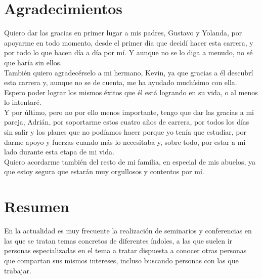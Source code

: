 \documentclass[a4paper, 12pt]{book}
\begin{document}

\chapter*{Agradecimientos}
Quiero dar las gracias en primer lugar a mis padres, Gustavo y Yolanda, por apoyarme en todo momento, desde el primer día que decidí hacer esta carrera, y por todo lo que hacen día a día por mí. Y aunque no se lo diga a menudo, no sé que haría sin ellos.\\

También quiero agradecérselo a mi hermano, Kevin, ya que gracias a él descubrí esta carrera y, aunque no se de cuenta, me ha ayudado muchísimo con ella. Espero poder lograr los mismos éxitos que él está logrando en su vida, o al menos lo intentaré.\\

Y por último, pero no por ello menos importante, tengo que dar las gracias a mi pareja, Adrián, por soportarme estos cuatro años de carrera, por todos los días sin salir y los planes que no podíamos hacer porque yo tenía que estudiar, por darme apoyo y fuerzas cuando más lo necesitaba y, sobre todo, por estar a mi lado durante esta etapa de mi vida.\\

Quiero acordarme también del resto de mi familia, en especial de mis abuelos, ya que estoy segura que estarán muy orgullosos y contentos por mí.



\chapter*{Resumen}
En la actualidad es muy frecuente la realización de seminarios y conferencias en las que se tratan temas concretos de diferentes índoles, a las que suelen ir personas especializadas en el tema a tratar dispuesta a conocer otras personas que compartan sus mismos intereses, incluso buscando personas con las que trabajar.\\
\end{document}

